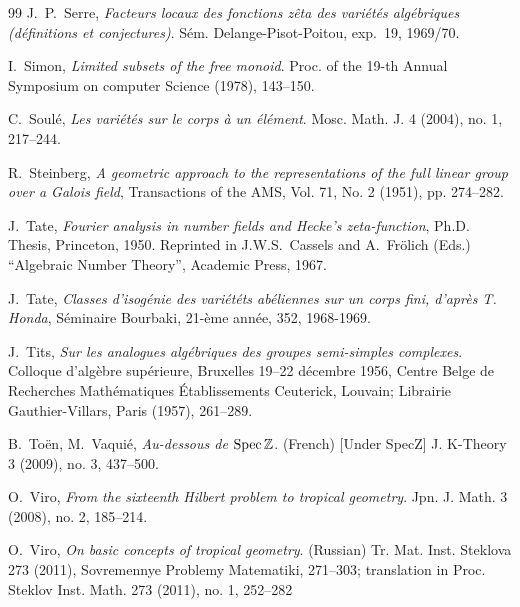 \documentclass[12pt]{article}
\def\Spec{{\rm Spec\,}}
\def\Z{{\mathbb Z}}
\begin{document}
\begin{thebibliography}{99}
 J.~P.~Serre, {\em Facteurs locaux des fonctions z\^eta
des vari\'et\'es alg\'ebriques (d\'efinitions et conjectures)}.
S\'em. Delange-Pisot-Poitou, exp.~19, 1969/70.


 I.~Simon, {\em Limited subsets of the free monoid}. 
Proc. of the 19-th Annual Symposium on computer Science (1978), 143--150.



 C.~Soul\'e, {\em Les vari\'et\'es sur le corps \`a un
\'el\'ement}. Mosc. Math. J. 4 (2004), no. 1, 217--244.


 R.~Steinberg, {\em A geometric approach to the representations of the full linear group over a Galois field}, Transactions of the AMS, Vol. 71, No. 2 (1951), pp. 274--282.





 J.~Tate, {\em Fourier analysis in number fields and
Hecke's zeta-function}, Ph.D. Thesis, Princeton, 1950. Reprinted in
J.W.S.~Cassels and A.~Fr\"olich (Eds.) ``Algebraic Number Theory'',
Academic Press, 1967.


 J.~Tate, {\em Classes d'isog\' enie des vari\' et\' ets ab\' eliennes sur un corps fini, d'apr\`es T. Honda}, S\' eminaire Bourbaki, 21-\`eme ann\' ee,
352, 1968-1969.


 J.~Tits, {\em Sur les analogues alg\'ebriques des groupes semi-simples
complexes}. Colloque d'alg\`ebre sup\'erieure, Bruxelles 19--22
d\'ecembre 1956, Centre Belge de Recherches Math\'ematiques \'Etablissements
Ceuterick, Louvain; Librairie Gauthier-Villars, Paris   (1957), 261--289.

 B.~To\"{e}n, M.~Vaqui\' e, {\em Au-dessous de $\Spec\Z$}. (French) [Under SpecZ] J. K-Theory 3 (2009), no. 3, 437--500.



 O.~Viro,  {\em From the sixteenth Hilbert problem to tropical geometry}. Jpn. J. Math. 3 (2008), no. 2, 185--214.


 O.~Viro, {\em On basic concepts of tropical geometry}. (Russian) Tr. Mat. Inst. Steklova 273 (2011), Sovremennye Problemy Matematiki, 271--303; 
translation in Proc. Steklov Inst. Math. 273 (2011), no. 1, 252--282


\end{thebibliography}
\end{document}
